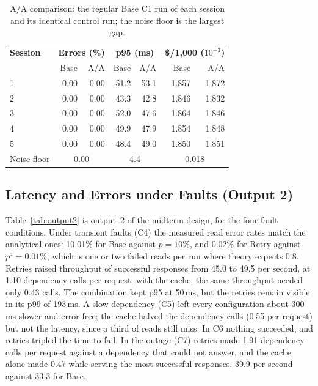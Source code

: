 \documentclass[10pt]{article}
\begin{document}
\begin{table}[htbp]
\centering
\footnotesize
\begin{tabular}{@{}lrrrrrr@{}}
\toprule
\textbf{Session} & \multicolumn{2}{c}{\textbf{Errors (\%)}} & \multicolumn{2}{c}{\textbf{p95 (ms)}} & \multicolumn{2}{c}{\textbf{\$/1{,}000 ($10^{-3}$)}} \\
 & Base & A/A & Base & A/A & Base & A/A \\
\midrule
1 & 0.00 & 0.00 & 51.2 & 53.1 & 1.857 & 1.872 \\
2 & 0.00 & 0.00 & 43.3 & 42.8 & 1.846 & 1.832 \\
3 & 0.00 & 0.00 & 52.0 & 47.6 & 1.864 & 1.846 \\
4 & 0.00 & 0.00 & 49.9 & 47.9 & 1.854 & 1.848 \\
5 & 0.00 & 0.00 & 48.4 & 49.0 & 1.850 & 1.851 \\
\midrule
Noise floor & \multicolumn{2}{c}{0.00} & \multicolumn{2}{c}{4.4} & \multicolumn{2}{c}{0.018} \\
\bottomrule
\end{tabular}
\caption{A/A comparison: the regular Base C1 run of each session and its
identical control run; the noise floor is the largest gap.}
\label{tab:aa}
\end{table}

\subsection{Latency and Errors under Faults (Output 2)}
Table~\ref{tab:output2} is output~2 of the midterm design, for the four fault
conditions. Under transient faults (C4) the measured read error rates match the
analytical ones: 10.01\% for Base against $p = 10\%$, and 0.02\% for Retry
against $p^4 = 0.01\%$, which is one or two failed reads per run where theory
expects 0.8. Retries raised throughput of successful responses from 45.0 to
49.5 per second, at 1.10 dependency calls per request; with the cache, the same
throughput needed only 0.43 calls. The combination kept p95 at 50\,ms, but the
retries remain visible in its p99 of 193\,ms. A slow dependency (C5) left every
configuration about 300\,ms slower and error-free; the cache halved the
dependency calls (0.55 per request) but not the latency, since a third of reads
still miss. In C6 nothing succeeded, and retries tripled the time to fail. In
the outage (C7) retries made 1.91 dependency calls per request against a
dependency that could not answer, and the cache alone made 0.47 while serving the
most successful responses, 39.9 per second against 33.3 for Base.
\end{document}
